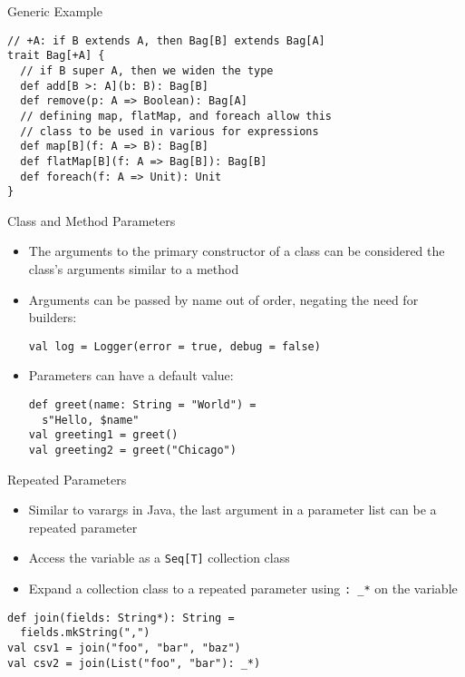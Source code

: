\documentclass{beamer}
\begin{document}
\begin{frame}[fragile]{Generic Example}
\begin{lstlisting}
// +A: if B extends A, then Bag[B] extends Bag[A]
trait Bag[+A] {
  // if B super A, then we widen the type
  def add[B >: A](b: B): Bag[B]
  def remove(p: A => Boolean): Bag[A]
  // defining map, flatMap, and foreach allow this
  // class to be used in various for expressions
  def map[B](f: A => B): Bag[B]
  def flatMap[B](f: A => Bag[B]): Bag[B]
  def foreach(f: A => Unit): Unit
}
\end{lstlisting}
\end{frame}

\begin{frame}[fragile]{Class and Method Parameters}
\begin{itemize}
\item The arguments to the primary constructor of a class can be considered the
class's arguments similar to a method
\item Arguments can be passed by name out of order, negating the need for builders:
\begin{lstlisting}
val log = Logger(error = true, debug = false)
\end{lstlisting}
\item Parameters can have a default value:
\begin{lstlisting}
def greet(name: String = "World") =
  s"Hello, $name"
val greeting1 = greet()
val greeting2 = greet("Chicago")
\end{lstlisting}
\end{itemize}
\end{frame}

\begin{frame}[fragile]{Repeated Parameters}
\begin{itemize}
\item Similar to varargs in Java, the last argument in a parameter list can be a
repeated parameter
\item Access the variable as a \lstinline{Seq[T]} collection class
\item Expand a collection class to a repeated parameter using \lstinline{: _*} on the variable
\end{itemize}
\begin{lstlisting}
def join(fields: String*): String =
  fields.mkString(",")
val csv1 = join("foo", "bar", "baz")
val csv2 = join(List("foo", "bar"): _*)
\end{lstlisting}
\end{frame}
\end{document}
